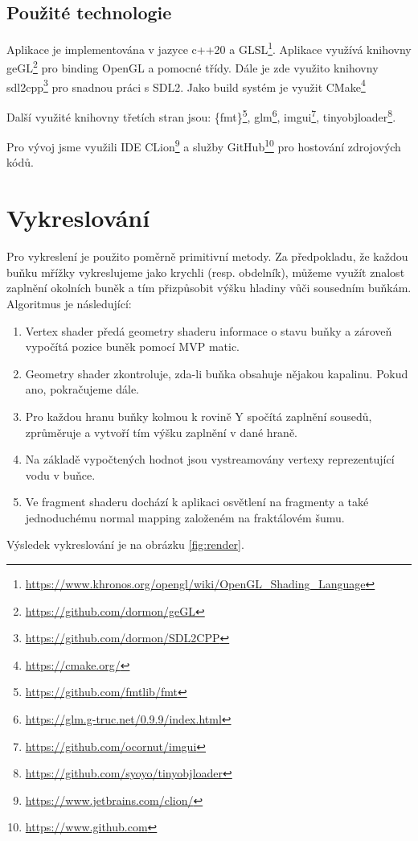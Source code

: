 \documentclass[12pt,a4paper,titlepage,final]{report}
\begin{document}
\subsection{Použité technologie}
Aplikace je implementována v jazyce c++20 a GLSL\footnote{\url{https://www.khronos.org/opengl/wiki/OpenGL_Shading_Language}}. Aplikace využívá knihovny geGL\footnote{\url{https://github.com/dormon/geGL}} pro binding OpenGL a pomocné třídy. Dále je zde využito knihovny sdl2cpp\footnote{\url{https://github.com/dormon/SDL2CPP}} pro snadnou práci s SDL2. Jako build systém je využit CMake\footnote{\url{https://cmake.org/}}

Další využité knihovny třetích stran jsou: \{fmt\}\footnote{\url{https://github.com/fmtlib/fmt}}, glm\footnote{\url{https://glm.g-truc.net/0.9.9/index.html}}, imgui\footnote{\url{https://github.com/ocornut/imgui}}, tinyobjloader\footnote{\url{https://github.com/syoyo/tinyobjloader}}.

Pro vývoj jsme využili IDE CLion\footnote{\url{https://www.jetbrains.com/clion/}} a služby GitHub\footnote{\url{https://www.github.com}} pro hostování zdrojových kódů.

\newpage
\section{Vykreslování}
Pro vykreslení je použito poměrně primitivní metody. Za předpokladu, že každou buňku mřížky vykreslujeme jako krychli (resp. obdelník), můžeme využít znalost zaplnění okolních buněk a tím přizpůsobit výšku hladiny vůči sousedním buňkám. Algoritmus je následující:
\begin{enumerate}
    \item Vertex shader předá geometry shaderu informace o stavu buňky a zároveň vypočítá pozice buněk pomocí MVP matic.
    \item Geometry shader zkontroluje, zda-li buňka obsahuje nějakou kapalinu. Pokud ano, pokračujeme dále.
    \item Pro každou hranu buňky kolmou k rovině Y spočítá zaplnění sousedů, zprůměruje a vytvoří tím výšku zaplnění v dané hraně.
    \item Na základě vypočtených hodnot jsou vystreamovány vertexy reprezentující vodu v buňce.
    \item Ve fragment shaderu dochází k aplikaci osvětlení na fragmenty a také jednoduchému normal mapping založeném na fraktálovém šumu.
\end{enumerate}

Výsledek vykreslování je na obrázku \ref{fig:render}.
\end{document}
